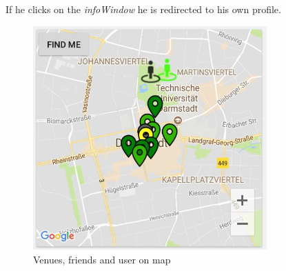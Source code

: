 If he clicks on the \textit{infoWindow} he is redirected to his own profile.

\begin{figure}[htbp]
 	\includegraphics[width=0.8\textwidth]{images/venuesonmap.jpg}
 	\centering
 	\caption{Venues, friends and user on map}\label{fig:venuesonmap}
\end{figure}


